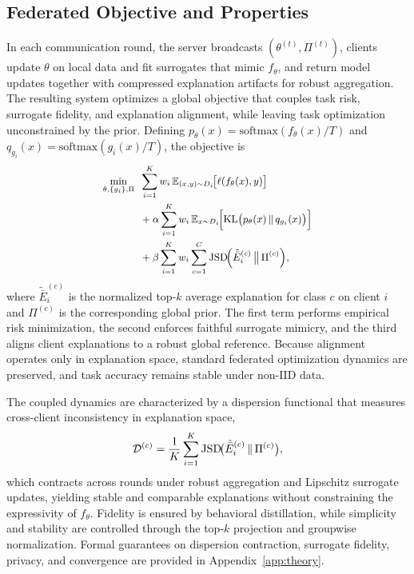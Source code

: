 \documentclass{article}
\theoremstyle{plain}
\theoremstyle{definition}
\theoremstyle{remark}
\begin{document}
\subsection{Federated Objective and Properties}

In each communication round, the server broadcasts $(\theta^{(t)},\Pi^{(t)})$, clients update $\theta$ on local data and fit surrogates that mimic $f_\theta$, and return model updates together with compressed explanation artifacts for robust aggregation. The resulting system optimizes a global objective that couples task risk, surrogate fidelity, and explanation alignment, while leaving task optimization unconstrained by the prior. Defining $p_\theta(x)=\mathrm{softmax}(f_\theta(x)/T)$ and $q_{g_i}(x)=\mathrm{softmax}(g_i(x)/T)$, the objective is
\begin{equation}
\label{eq:global-iclr}
{\small
\begin{aligned}
\min_{\theta,\{g_i\},\Pi}\;\;
&\sum_{i=1}^{K} w_i\,\mathbb{E}_{(x,y)\sim D_i}\!\big[\ell(f_\theta(x),y)\big] \\
&+ \alpha \sum_{i=1}^{K} w_i\,\mathbb{E}_{x\sim D_i}\!\Big[\mathrm{KL}\big(p_\theta(x)\,\|\,q_{g_i}(x)\big)\Big] \\
&+ \beta \sum_{i=1}^{K} w_i \sum_{c=1}^{C} \mathrm{JSD}\!\Big(\tilde{\bar{E}}_i^{(c)} \,\big\|\, \Pi^{(c)}\Big),
\end{aligned}
}
\end{equation}
where $\tilde{\bar{E}}_i^{(c)}$ is the normalized top-$k$ average explanation for class $c$ on client $i$ and $\Pi^{(c)}$ is the corresponding global prior. The first term performs empirical risk minimization, the second enforces faithful surrogate mimicry, and the third aligns client explanations to a robust global reference. Because alignment operates only in explanation space, standard federated optimization dynamics are preserved, and task accuracy remains stable under non-IID data.

The coupled dynamics are characterized by a dispersion functional that measures cross-client inconsistency in explanation space,
\begin{equation}
\label{eq:disp-iclr}
{\small
\mathcal{D}^{(c)}
=\frac{1}{K}\sum_{i=1}^{K}
\mathrm{JSD}\!\big(\tilde{\bar{E}}_i^{(c)}\,\|\,\Pi^{(c)}\big),
}
\end{equation}
which contracts across rounds under robust aggregation and Lipschitz surrogate updates, yielding stable and comparable explanations without constraining the expressivity of $f_\theta$. Fidelity is ensured by behavioral distillation, while simplicity and stability are controlled through the top-$k$ projection and groupwise normalization. Formal guarantees on dispersion contraction, surrogate fidelity, privacy, and convergence are provided in Appendix~\ref{app:theory}.
\end{document}
